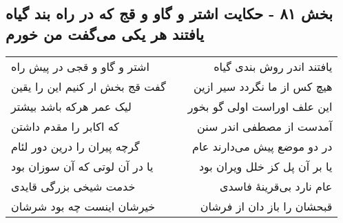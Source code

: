 \begin{center}
\section*{بخش ۸۱ - حکایت اشتر و گاو و قج که در راه بند گیاه یافتند هر یکی می‌گفت من خورم}
\label{sec:sh081}
\begin{longtable}{l p{0.5cm} r}
اشتر و گاو و قجی در پیش راه
&&
یافتند اندر روش بندی گیاه
\\
گفت قج بخش ار کنیم این را یقین
&&
هیچ کس از ما نگردد سیر ازین
\\
لیک عمر هرکه باشد بیشتر
&&
این علف اوراست اولی گو بخور
\\
که اکابر را مقدم داشتن
&&
آمدست از مصطفی اندر سنن
\\
گرچه پیران را درین دور لئام
&&
در دو موضع پیش می‌دارند عام
\\
یا در آن لوتی که آن سوزان بود
&&
یا بر آن پل کز خلل ویران بود
\\
خدمت شیخی بزرگی قایدی
&&
عام نارد بی‌قرینهٔ فاسدی
\\
خیرشان اینست چه بود شرشان
&&
قبحشان را باز دان از فرشان
\\
\end{longtable}
\end{center}

